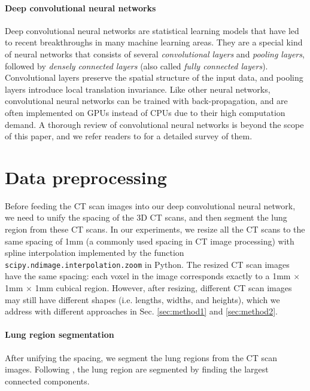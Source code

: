 \documentclass{article}
\begin{document}
\paragraph{Deep convolutional neural networks}
Deep convolutional neural networks are statistical learning models that have led to recent breakthroughs in many machine learning areas. They are a special kind of neural networks that consists of several \textit{convolutional layers} and \textit{pooling layers}, followed by \textit{densely connected layers} (also called \textit{fully connected layers}). Convolutional layers preserve the spatial structure of the input data, and pooling layers introduce local translation invariance. Like other neural networks, convolutional neural networks can be trained with back-propagation, and are often implemented on GPUs instead of CPUs due to their high computation demand. A thorough review of convolutional neural networks is beyond the scope of this paper, and we refer readers to \cite{Goodfellow-et-al-2016} for a detailed survey of them.


\section{Data preprocessing}
\label{sec:preprocssing}
Before feeding the CT scan images into our deep convolutional neural network, we need to unify the spacing of the 3D CT scans, and then segment the lung region from these CT scans. In our experiments, we resize all the CT scans to the same spacing of 1mm (a commonly used spacing in CT image processing) with spline interpolation \cite{spline_interpolation} implemented by the function \verb|scipy.ndimage.interpolation.zoom| in Python. The resized CT scan images have the same spacing: each voxel in the image corresponds exactly to a 1mm $\times$ 1mm $\times$ 1mm cubical region. However, after resizing, different CT scan images may still have different shapes (i.e. lengths, widths, and heights), which we address with different approaches in Sec. \ref{sec:method1} and \ref{sec:method2}.

\paragraph{Lung region segmentation}
After unifying the spacing, we segment the lung regions from the CT scan images. Following \cite{full_preprocssing_tutorial}, the lung region are segmented by finding the largest connected components.
\end{document}
